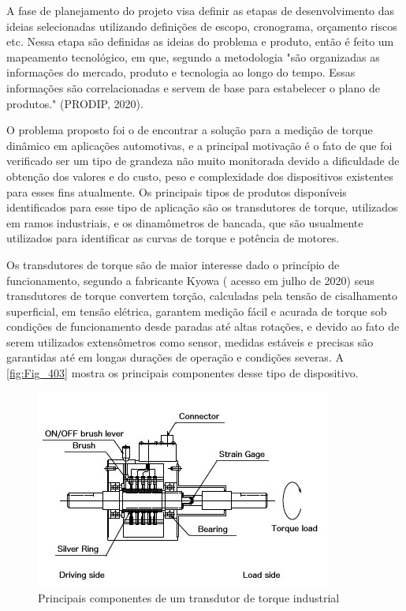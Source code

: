 A fase de planejamento do projeto visa definir as etapas de desenvolvimento das ideias selecionadas utilizando definições de escopo, cronograma, orçamento riscos etc. Nessa etapa são definidas as ideias do problema e produto, então é feito um mapeamento tecnológico, em que, segundo a metodologia "são organizadas as informações do mercado, produto e tecnologia ao longo do tempo. Essas informações são correlacionadas e servem de base para estabelecer o plano de produtos." (PRODIP, 2020).

O problema proposto foi o de encontrar a solução para a medição de torque dinâmico em aplicações automotivas, e a principal motivação é o fato de que foi verificado ser um tipo de grandeza não muito monitorada devido a dificuldade de obtenção dos valores e do custo, peso e complexidade dos dispositivos existentes para esses fins atualmente. Os principais tipos de produtos disponíveis identificados para esse tipo de aplicação são os transdutores de torque, utilizados em ramos industriais, e os dinamômetros de bancada, que são usualmente utilizados para identificar as curvas de torque e potência de motores.

Os transdutores de torque são de maior interesse dado o princípio de funcionamento, segundo a fabricante Kyowa  (%
acesso em julho de 2020) seus transdutores de torque convertem torção, calculadas pela tensão de cisalhamento superficial, em tensão elétrica, garantem medição fácil e acurada de torque sob condições de funcionamento desde paradas até altas rotações, e devido ao fato de serem utilizados extensômetros como sensor, medidas estáveis e precisas são garantidas até em longas durações de operação e condições severas. A \autoref{fig:Fig_403} mostra os principais componentes desse tipo de dispositivo.

\begin{figure}[htb]
	\caption{\label{fig:Fig_403}Principais componentes de um transdutor de torque industrial}
	\begin{center}
		\includegraphics{images/img403.jpg}
	\end{center}
\end{figure}


